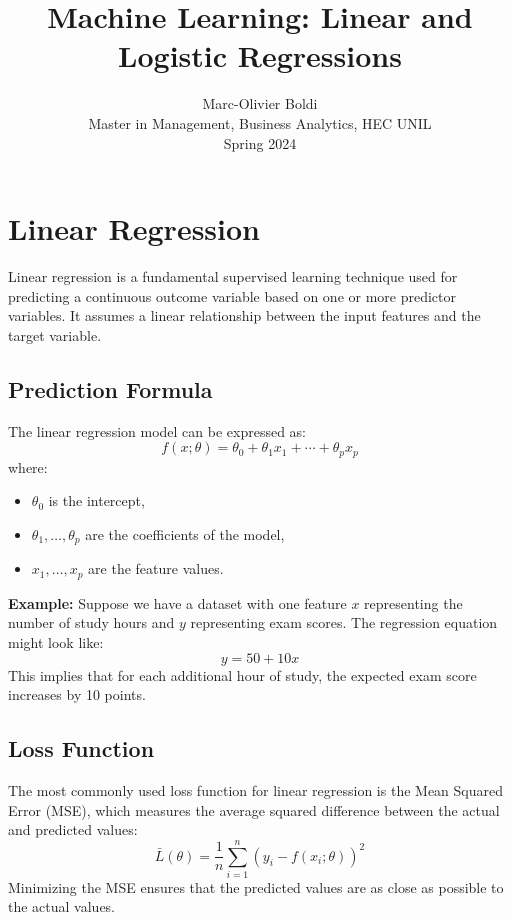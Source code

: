 \documentclass[twocolumn]{article}
\title{Machine Learning: Linear and Logistic Regressions}
\author{Marc-Olivier Boldi\\Master in Management, Business Analytics, HEC UNIL\\Spring 2024}
\date{}
\begin{document}
\maketitle

\section{Linear Regression}
Linear regression is a fundamental supervised learning technique used for predicting a continuous outcome variable based on one or more predictor variables. It assumes a linear relationship between the input features and the target variable.

\subsection{Prediction Formula}
The linear regression model can be expressed as:
\begin{equation}
    f(x; \theta) = \theta_0 + \theta_1 x_1 + \cdots + \theta_p x_p
\end{equation}
where:
\begin{itemize}
    \item $\theta_0$ is the intercept,
    \item $\theta_1, \dots, \theta_p$ are the coefficients of the model,
    \item $x_1, \dots, x_p$ are the feature values.
\end{itemize}

\textbf{Example:} Suppose we have a dataset with one feature $x$ representing the number of study hours and $y$ representing exam scores. The regression equation might look like:
\begin{equation}
    y = 50 + 10x
\end{equation}
This implies that for each additional hour of study, the expected exam score increases by 10 points.

\subsection{Loss Function}
The most commonly used loss function for linear regression is the Mean Squared Error (MSE), which measures the average squared difference between the actual and predicted values:
\begin{equation}
    \bar{L}(\theta) = \frac{1}{n} \sum_{i=1}^{n} (y_i - f(x_i; \theta))^2
\end{equation}
Minimizing the MSE ensures that the predicted values are as close as possible to the actual values.
\end{document}
